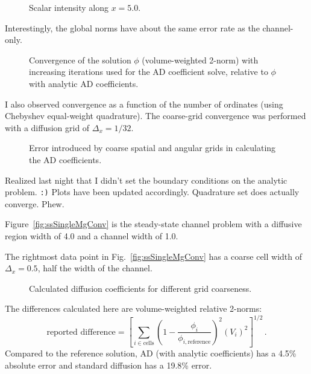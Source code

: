 \begin{figure}[htb]
  \centering
  
  \caption{Scalar intensity along $x=5.0$.}
  \label{fig:ssSingleCenterline}
\end{figure}

Interestingly, the global norms have about the same error rate as the
channel-only. 

\begin{figure}[htb]
  \centering
  
  \caption{Convergence of the solution $\phi$ (volume-weighted 2-norm) with
  increasing iterations used for the AD coefficient solve, relative to $\phi$
  with analytic AD coefficients.}
  \label{fig:ssSingleMcconv}
\end{figure}

I also observed convergence as a function of the number of ordinates (using
Chebyshev equal-weight quadrature). The coarse-grid convergence was performed
with a diffusion grid of $\Delta_x = 1/32$.

\begin{figure}[htb]
  \centering
  \caption{Error introduced by coarse spatial and angular grids in
  calculating the AD coefficients.}
  \label{fig:ssSingleConv}
\end{figure}

Realized last night that I didn't set the boundary conditions on the analytic
problem. \verb|:)| Plots have been updated accordingly. Quadrature set does
actually converge. Phew.

Figure~\ref{fig:ssSingleMgConv} is the steady-state channel problem with a
diffusive region width of 4.0 and a channel width of 1.0.

The rightmost data point in Fig.~\ref{fig:ssSingleMgConv} has a coarse cell
width of $\Delta_x=0.5$, half the width of the channel.

\begin{figure}[htb]
  \centering
%
  \caption{Calculated diffusion coefficients for different grid coarseness.}
  \label{fig:ssSingleMgD}
\end{figure}

The differences calculated here are volume-weighted relative 2-norms:
\begin{equation}\label{eq:rel2norm}
  \text{reported difference} =
  \left[ \sum_{i \in \text{cells}} \left( 1 -
  \frac{\phi_i}{\phi_{i,\text{reference}}} \right)^2 (V_i)^2\right]^{1/2} \,.
\end{equation}
Compared to the reference solution, AD (with analytic coefficients) has a 4.5\%
absolute error and standard diffusion has a 19.8\% error.


